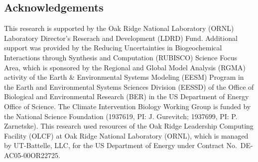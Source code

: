 \documentclass[landscape,custom]{sciposter}
\begin{document}
\begin{multicols}{4}
\section*{\large Acknowledgements}


\vspace*{-0.15in}
\vbox{%
This research is supported by the Oak Ridge National Laboratory (ORNL)
Laboratory Director's Reserach and Development (LDRD) Fund.
Additional support was provided by the Reducing Uncertainties in
Biogeochemical Interactions through Synthesis and Computation (RUBISCO)
Science Focus Area, which is sponsored by the Regional and Global Model
Analysis (RGMA) activity of the Earth \& Environmental Systems Modeling
(EESM) Program in the Earth and Environmental Systems Sciences Division
(EESSD) of the Office of Biological and Environmental Research (BER)
in the US Department of Energy Office of Science.
%
The Climate Intervention Biology Working Group is funded by the National
Science Foundation (1937619, PI: J. Gurevitch; 1937699, PI: P. Zarnetske).
%
This research used resources of the Oak Ridge Leadership Computing
Facility (OLCF) at Oak Ridge National Laboratory (ORNL), which is managed
by UT-Battelle, LLC, for the US Department of Energy under Contract
No.\ DE-AC05-00OR22725.
%
%
%
%
}


\end{multicols}
\end{document}
